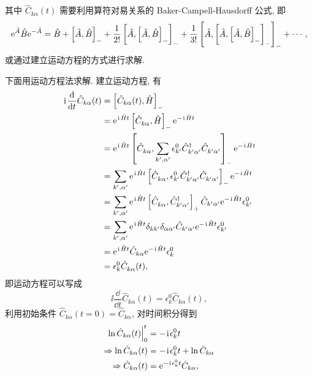 其中 $\hat{C}_{k\alpha}(t)$ 需要利用算符对易关系的 Baker-Campell-Hausdorff 公式, 即
\begin{equation}
    \mathrm{e}^{\hat{A}}\hat{B}\mathrm{e}^{-\hat{A}}=\hat{B}+\left[ \hat{A},\hat{B} \right]_-+\frac{1}{2!}\left[ \hat{A},\left[ \hat{A},\hat{B} \right]_- \right]_-+\frac{1}{3!}\left[ \hat{A},\left[ \hat{A},\left[ \hat{A},\hat{B} \right]_- \right]_- \right]_-+\cdots,
\end{equation}
或通过建立运动方程的方式进行求解. 

下面用运动方程法求解. 建立运动方程, 有
 \begin{align}
        \hspace{0.1em}\mathrm{i}\hspace{0.1em}\frac{\mathrm{d}}{\mathrm{d} t}\hat{C}_{k\alpha}(t)&=\left[ \hat{C}_{k\alpha}(t),\hat{H} \right]_-\nonumber\\
        &=\mathrm{e}^{\hspace{0.1em}\mathrm{i}\hspace{0.1em}\hat{H}t}\left[ \hat{C}_{k\alpha}^{ },\hat{H} \right]_-\mathrm{e}^{-\hspace{0.1em}\mathrm{i}\hspace{0.1em}\hat{H}t}\nonumber\\
        &=\mathrm{e}^{\hspace{0.1em}\mathrm{i}\hspace{0.1em}\hat{H}t}\left[ \hat{C}^{ }_{k\alpha},\sum_{k',\alpha'}\epsilon_{k'}^0\hat{C}_{k'\alpha'}^\dagger\hat{C}_{k'\alpha'}^{ }\right]_-\mathrm{e}^{-\hspace{0.1em}\mathrm{i}\hspace{0.1em}\hat{H}t}\nonumber\\
        &=\sum_{k',\alpha'}\mathrm{e}^{\hspace{0.1em}\mathrm{i}\hspace{0.1em}\hat{H}t}\left[ \hat{C}^{ }_{k\alpha},\epsilon_{k'}^0\hat{C}_{k'\alpha'}^\dagger \hat{C}_{k'\alpha'}^{ } \right]_-\mathrm{e}^{-\hspace{0.1em}\mathrm{i}\hspace{0.1em}\hat{H}t}\nonumber\\
        &=\sum_{k',\alpha'}\mathrm{e}^{\hspace{0.1em}\mathrm{i}\hspace{0.1em}\hat{H}t}\left[ \hat{C}_{k\alpha}^{ },\hat{C}_{k'\alpha'}^\dagger \right]_+\hat{C}_{k'\alpha'}\mathrm{e}^{-\hspace{0.1em}\mathrm{i}\hspace{0.1em}\hat{H}t}\epsilon_{k'}^0\nonumber\\
        &=\sum_{k',\alpha'}\mathrm{e}^{\hspace{0.1em}\mathrm{i}\hspace{0.1em}\hat{H}t}\delta_{kk'}\delta_{\alpha\alpha'}\hat{C}_{k'\alpha'}\mathrm{e}^{-\hspace{0.1em}\mathrm{i}\hspace{0.1em}\hat{H}t}\epsilon_{k'}^0\nonumber\\
        &=\mathrm{e}^{\hspace{0.1em}\mathrm{i}\hspace{0.1em}\hat{H}t}\hat{C}_{k\alpha}\mathrm{e}^{-\hspace{0.1em}\mathrm{i}\hspace{0.1em}\hat{H}t}\epsilon_k^0\nonumber\\
        &=\epsilon_k^0\hat{C}_{k\alpha}^{ }(t),
    \end{align}
即运动方程可以写成
\begin{equation}
    \ii\frac{\dd}{\dd t}\hat{C}_{k\alpha}(t)=\epsilon_k^0\hat{C}_{k\alpha}(t),
\end{equation}
利用初始条件 $\hat{C}_{k\alpha}(t=0)=\hat{C}_{k\alpha}$, 对时间积分得到
 \begin{align}
        \ln\hat{C}_{k\alpha}(t)\Big|_0^t&=-\hspace{0.1em}\mathrm{i}\hspace{0.1em}\epsilon_k^0t\nonumber\\
        \Rightarrow \ln \hat{C}_{k\alpha}(t)&=-\hspace{0.1em}\mathrm{i}\hspace{0.1em}\epsilon_k^0 t+\ln \hat{C}_{k\alpha}\nonumber\\
        \Rightarrow \hat{C}_{k\alpha}(t)&=\mathrm{e}^{-\hspace{0.1em}\mathrm{i}\hspace{0.1em}\epsilon_k^0t}\hat{C}_{k\alpha},
    \end{align}
